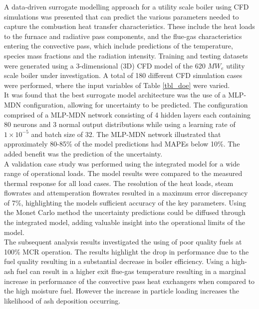 \documentclass[a4paper,fleqn]{cas-dc}
\begin{document}
A data-driven surrogate modelling approach for a utility scale boiler using CFD simulations was presented that can predict the various parameters needed to capture the combustion heat transfer characteristics. These include the heat loads to the furnace and radiative pass components, and the flue-gas characteristics entering the convective pass, which include predictions of the temperature, species mass fractions and the radiation intensity. Training and testing datasets were generated using a 3-dimensional (3D) CFD model of the 620 $MW_e$ utility scale boiler under investigation. A total of 180 different CFD simulation cases were performed, where the input variables of Table \ref{tbl_doe} were varied.\\

It was found that the best surrogate model architecture was the use of a MLP-MDN configuration, allowing for uncertainty to be predicted. The configuration comprised of a MLP-MDN network consisting of 4 hidden layers each containing 80 neurons and 3 normal output distributions while using a learning rate of $1\times10^{-5}$ and batch size of 32. The MLP-MDN network illustrated that approximately 80-85\% of the model predictions had MAPEs below 10\%. The added benefit was the prediction of the uncertainty.\\

A validation case study was performed using the integrated model for a wide range of operational loads. The model results were compared to the measured thermal response for all load cases. The resolution of the heat loads, steam flowrates and attemperation flowrates resulted in a maximum error discrepancy of 7\%, highlighting the models sufficient accuracy of the key parameters. Using the Monet Carlo method the uncertainty predictions could be diffused through the integrated model, adding valuable insight into the operational limits of the model.\\

The subsequent analysis results investigated the using of poor quality fuels at 100\% MCR operation. The results highlight the drop in performance due to the fuel quality resulting in a substantial decrease in boiler efficiency. Using a high-ash fuel can result in a higher exit flue-gas temperature resulting in a marginal increase in performance of the convective pass heat exchangers when compared to the high moisture fuel. However the increase in particle loading increases the likelihood of ash deposition occurring.\\ 
\end{document}
